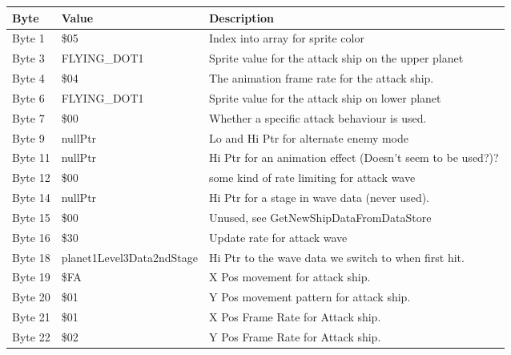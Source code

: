 \begin{figure}[H]
{\begin{adjustbox}{width=12cm}
\begin{tabular}{lll}
\toprule
 Byte    & Value                     & Description                                                        \\
\midrule
 Byte 1  & \$05                       & Index into array for sprite color                                  \\
 Byte 3  & FLYING\_DOT1               & Sprite value for the attack ship on the upper planet               \\
 Byte 4  & \$04                       & The animation frame rate for the attack ship.                      \\
 Byte 6  & FLYING\_DOT1               & Sprite value for the attack ship on lower planet                   \\
 Byte 7  & \$00                       & Whether a specific attack behaviour is used.                       \\
 Byte 9  & nullPtr                   & Lo and Hi Ptr for alternate enemy mode                             \\
 Byte 11 & nullPtr                   & Hi Ptr for an animation effect (Doesn't seem to be used?)?         \\
 Byte 12 & \$00                       & some kind of rate limiting for attack wave                         \\
 Byte 14 & nullPtr                   & Hi Ptr for a stage in wave data (never used).                      \\
 Byte 15 & \$00                       & Unused, see GetNewShipDataFromDataStore                            \\
 Byte 16 & \$30                       & Update rate for attack wave                                        \\
 Byte 18 & planet1Level3Data2ndStage & Hi Ptr to the wave data we switch to when first hit.               \\
 Byte 19 & \$FA                       & X Pos movement for attack ship.                                    \\
 Byte 20 & \$01                       & Y Pos movement pattern for attack ship.                            \\
 Byte 21 & \$01                       & X Pos Frame Rate for Attack ship.                                  \\
 Byte 22 & \$02                       & Y Pos Frame Rate for Attack ship.                                  \\

\end{tabular}
\end{adjustbox}}
\end{figure}
